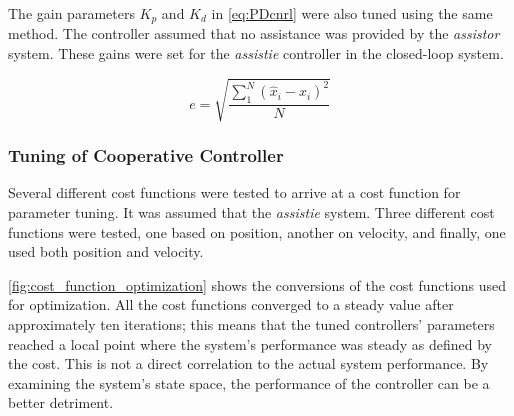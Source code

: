 The gain parameters $K_p$ and $K_d$ in \autoref{eq:PDcnrl} were also tuned using the same method. The controller assumed that no assistance was provided by the \textit{assistor} system. These gains were set for the \textit{assistie} controller in the closed-loop system.

\begin{equation}
    e = \sqrt{ \frac{ \sum_1^N ( \hat{x}_i - x_i )^2 }{N}  }
    \label{eq:RMSE}
\end{equation}

\subsubsection{Tuning of Cooperative Controller}
Several different cost functions were tested to arrive at a cost function for parameter tuning. It was assumed that the \textit{assistie} system. Three different cost functions were tested, one based on position, another on velocity, and finally, one used both position and velocity.


\autoref{fig:cost_function_optimization} shows the conversions of the cost functions used for optimization. All the cost functions converged to a steady value after approximately ten iterations; this means that the tuned controllers' parameters reached a local point where the system's performance was steady as defined by the cost. This is not a direct correlation to the actual system performance. By examining the system's state space, the performance of the controller can be a better detriment.





